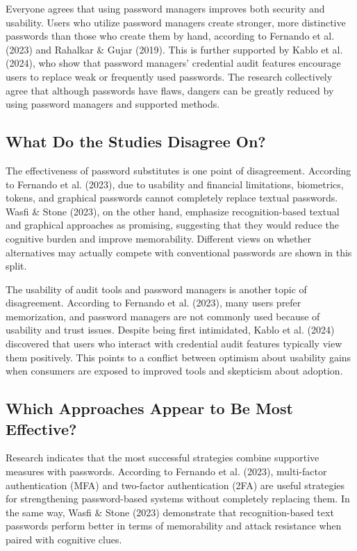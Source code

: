 \documentclass[12pt,a4paper]{article}
\begin{document}
\vspace{0.4cm}

Everyone agrees that using password managers improves both security and usability. Users who utilize password managers create stronger, more distinctive passwords than those who create them by hand, according to Fernando et al. (2023) and Rahalkar \& Gujar (2019). This is further supported by Kablo et al. (2024), who show that password managers' credential audit features encourage users to replace weak or frequently used passwords. The research collectively agree that although passwords have flaws, dangers can be greatly reduced by using password managers and supported methods.

\subsection{What Do the Studies Disagree On?}

The effectiveness of password substitutes is one point of disagreement. According to Fernando et al. (2023), due to usability and financial limitations, biometrics, tokens, and graphical passwords cannot completely replace textual passwords. Wasfi \& Stone (2023), on the other hand, emphasize recognition-based textual and graphical approaches as promising, suggesting that they would reduce the cognitive burden and improve memorability. Different views on whether alternatives may actually compete with conventional passwords are shown in this split.

\vspace{0.4cm}

The usability of audit tools and password managers is another topic of disagreement. According to Fernando et al. (2023), many users prefer memorization, and password managers are not commonly used because of usability and trust issues. Despite being first intimidated, Kablo et al. (2024) discovered that users who interact with credential audit features typically view them positively. This points to a conflict between optimism about usability gains when consumers are exposed to improved tools and skepticism about adoption.

\subsection{Which Approaches Appear to Be Most Effective?}

Research indicates that the most successful strategies combine supportive measures with passwords. According to Fernando et al. (2023), multi-factor authentication (MFA) and two-factor authentication (2FA) are useful strategies for strengthening password-based systems without completely replacing them. In the same way, Wasfi \& Stone (2023) demonstrate that recognition-based text passwords perform better in terms of memorability and attack resistance when paired with cognitive clues.
\end{document}
